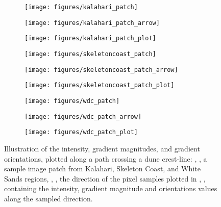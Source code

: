 \begin{figure}
	\centering
	\begin{subfigure}{0.15\textwidth}
		\centering
		\texttt{[image: figures/kalahari\_patch]}
		\caption{}
		\label{fig:kalahari_patch}
	\end{subfigure}
	\begin{subfigure}{0.15\textwidth}
		\centering
		\texttt{[image: figures/kalahari\_patch\_arrow]}
		\caption{}
		\label{fig:kalahari_patch_arrow}
	\end{subfigure}
	\begin{subfigure}{0.65\textwidth}
		\centering
		\texttt{[image: figures/kalahari\_patch\_plot]}
		\caption{}
		\label{fig:kalahari_patch_plot}
	\end{subfigure}
	
	\begin{subfigure}{0.15\textwidth}
		\centering
		\texttt{[image: figures/skeletoncoast\_patch]}
		\caption{}
		\label{fig:skeletoncoast_patch}
	\end{subfigure}
	\begin{subfigure}{0.15\textwidth}
		\centering
		\texttt{[image: figures/skeletoncoast\_patch\_arrow]}
		\caption{}
		\label{fig:skeletoncoast_patch_arrow}
	\end{subfigure}
	\begin{subfigure}{0.65\textwidth}
		\centering
		\texttt{[image: figures/skeletoncoast\_patch\_plot]}
		\caption{}
		\label{fig:skeletoncoast_patch_plot}
	\end{subfigure}
	
	\begin{subfigure}{0.15\textwidth}
		\centering
		\texttt{[image: figures/wdc\_patch]}
		\caption{}
		\label{fig:wdc_patch}
	\end{subfigure}
	\begin{subfigure}{0.15\textwidth}
		\centering
		\texttt{[image: figures/wdc\_patch\_arrow]}
		\caption{}
		\label{fig:wdc_patch_arrow}
	\end{subfigure}
	\begin{subfigure}{0.65\textwidth}
		\centering
		\texttt{[image: figures/wdc\_patch\_plot]}
		\caption{}
		\label{fig:wdc_patch_plot}
	\end{subfigure}
	\caption{Illustration of the intensity, gradient magnitudes, and gradient orientations, plotted along a path crossing a dune crest-line: , , a sample image patch from Kalahari, Skeleton Coast, and White Sands regions, , ,  the direction of the pixel samples plotted in , ,  containing the intensity, gradient magnitude and orientations values along the sampled direction. }
	\label{fig:patches}
\end{figure}

